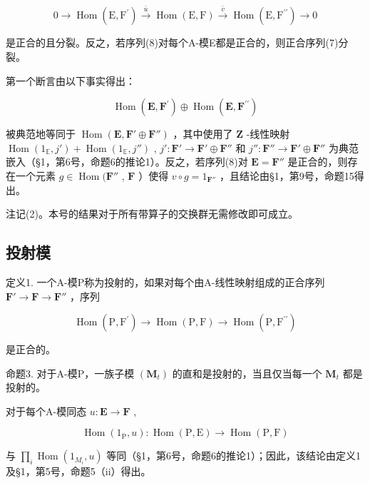 \[
0 \longrightarrow \operatorname{Hom} (\mathrm{E}, \mathrm{F} ^ {\prime}) \stackrel {\bar {u}} {\longrightarrow} \operatorname{Hom} (\mathrm{E}, \mathrm{F}) \stackrel {\bar {v}} {\longrightarrow} \operatorname{Hom} (\mathrm{E}, \mathrm{F} ^ {\prime \prime}) \longrightarrow 0\tag{8}
\]

是正合的且分裂。反之，若序列(8)对每个A-模E都是正合的，则正合序列(7)分裂。

第一个断言由以下事实得出：

\[
\operatorname{Hom} (\mathbf {E}, \mathbf {F} ^ {\prime}) \oplus \operatorname{Hom} (\mathbf {E}, \mathbf {F} ^ {\prime \prime})
\]

被典范地等同于 \(\operatorname{Hom}(\mathbf{E}, \mathbf{F}' \oplus \mathbf{F}'')\) ，其中使用了 \(\mathbf{Z}\) -线性映射 \(\operatorname{Hom}(1_{\mathbb{E}}, j') + \operatorname{Hom}(1_{\mathbb{E}}, j'')\) , \(j': \mathbf{F}' \to \mathbf{F}' \oplus \mathbf{F}''\) 和 \(j'': \mathbf{F}'' \to \mathbf{F}' \oplus \mathbf{F}''\) 为典范嵌入（§1，第6号，命题6的推论1）。反之，若序列(8)对 \(\mathbf{E} = \mathbf{F}''\) 是正合的，则存在一个元素 \(g \in \operatorname{Hom}(\mathbf{F}''\) , \(\mathbf{F}\) ）使得 \(v \circ g = 1_{\mathbf{F}''}\) ，且结论由§1，第9号，命题15得出。

注记(2)。本号的结果对于所有带算子的交换群无需修改即可成立。

\subsection{投射模}

定义1. 一个A-模P称为投射的，如果对每个由A-线性映射组成的正合序列 \(\mathbf{F}' \to \mathbf{F} \to \mathbf{F}''\) ，序列

\[
\operatorname{Hom} (\mathrm{P}, \mathrm{F} ^ {\prime}) \rightarrow \operatorname{Hom} (\mathrm{P}, \mathrm{F}) \rightarrow \operatorname{Hom} (\mathrm{P}, \mathrm{F} ^ {\prime \prime})
\]

是正合的。

命题3. 对于A-模P，一族子模 \((\mathbf{M}_{t})\) 的直和是投射的，当且仅当每一个 \(\mathbf{M}_{t}\) 都是投射的。

对于每个A-模同态 \(u: \mathbf{E} \to \mathbf{F}\) ,

\[
\operatorname{Hom} \left(1 _ {\mathrm{P}}, u\right): \operatorname{Hom} (\mathrm{P}, \mathrm{E}) \rightarrow \operatorname{Hom} (\mathrm{P}, \mathrm{F})
\]

与 \(\prod_{i}\operatorname{Hom}(1_{M_i},u)\) 等同（§1，第6号，命题6的推论1）；因此，该结论由定义1及§1，第5号，命题5（ii）得出。

